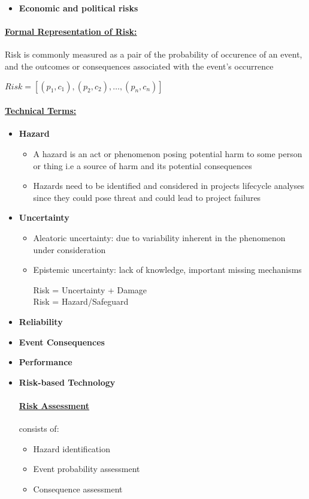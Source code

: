 \documentclass[8pt]{extreport}
\begin{document}
{\begin{itemize}
\item \textbf{Economic and political risks}
\end{itemize}

\paragraph{\underline{Formal Representation of Risk:}}
Risk is commonly measured as a pair of the probability of occurence of an event, and the outcomes or consequences associated with the event's occurrence
\begin{center}
$Risk = [(p_{1},c_{1}), (p_{2},c_{2}),\dots, (p_{n},c_{n})]$
\end{center}
\paragraph{\underline{Technical Terms:}}
\begin{itemize}
\item \textbf{Hazard}
\begin{itemize}
\item A hazard is an act or phenomenon posing potential harm to some person or thing i.e a source of harm and its potential consequences
\item Hazards need to be identified and considered in projects lifecycle analyses since they could pose threat and could lead to project failures
\end{itemize}
\item \textbf{Uncertainty}
\begin{itemize}
\item Aleatoric uncertainty: due to variability inherent in the phenomenon under consideration
\item Epistemic uncertainty: lack of knowledge, important missing mechanisms
\begin{center}
Risk = Uncertainty + Damage\\
Risk = Hazard/Safeguard
\end{center}
\end{itemize}

\item \textbf{Reliability}
\item \textbf{Event Consequences} 
\item \textbf{Performance}
\item \textbf{Risk-based Technology}
\paragraph{\underline{Risk Assessment}} consists of:
\begin{itemize}
\item Hazard identification
\item Event probability assessment
\item Consequence assessment
\end{itemize}

\end{itemize}}
\end{document}
